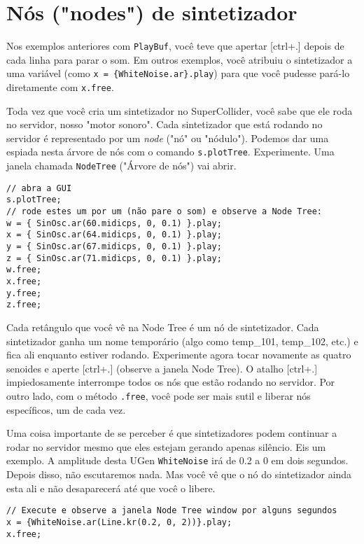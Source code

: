 \section{Nós ("nodes") de sintetizador}

Nos exemplos anteriores com \texttt{PlayBuf}, você teve que apertar [ctrl+.] depois de cada linha para parar o som. Em outros exemplos, você atribuiu o sintetizador a uma variável (como \texttt{x = \{WhiteNoise.ar\}.play}) para que você pudesse pará-lo diretamente com \texttt{x.free}.

Toda vez que você cria um sintetizador no SuperCollider, você sabe que ele roda no servidor, nosso "motor sonoro". Cada sintetizador que está rodando no servidor é representado por um \emph{node} ("nó" ou "nódulo"). Podemos dar uma espiada nesta árvore de nós com o comando \texttt{s.plotTree}. Experimente. Uma janela chamada \texttt{NodeTree} ("Árvore de nós") vai abrir.

 
\begin{lstlisting}[style=SuperCollider-IDE, basicstyle=\scttfamily\footnotesize]
// abra a GUI
s.plotTree;
// rode estes um por um (não pare o som) e observe a Node Tree:
w = { SinOsc.ar(60.midicps, 0, 0.1) }.play;
x = { SinOsc.ar(64.midicps, 0, 0.1) }.play;
y = { SinOsc.ar(67.midicps, 0, 0.1) }.play;
z = { SinOsc.ar(71.midicps, 0, 0.1) }.play;
w.free;
x.free;
y.free;
z.free;
\end{lstlisting}
 

Cada retângulo que você vê na Node Tree é um nó de sintetizador. Cada sintetizador ganha um nome temporário (algo como temp\_101, temp\_102, etc.) e fica ali enquanto estiver rodando. Experimente agora tocar novamente as quatro senoides e aperte [ctrl+.] (observe a janela Node Tree). O atalho [ctrl+.] impiedosamente interrompe todos os nós que estão rodando no servidor. Por outro lado, com o método \texttt{.free}, você pode ser mais sutil e liberar nós específicos, um de cada vez.

Uma coisa importante de se perceber é que sintetizadores podem continuar a rodar no servidor mesmo que eles estejam gerando apenas silêncio. Eis um exemplo. A amplitude desta UGen \texttt{WhiteNoise} irá de 0.2 a 0 em dois segundos. Depois disso, não escutaremos nada. Mas você vê que o nó do sintetizador ainda esta ali e não desaparecerá até que você o libere.

 
\begin{lstlisting}[style=SuperCollider-IDE, basicstyle=\scttfamily\footnotesize]
// Execute e observe a janela Node Tree window por alguns segundos
x = {WhiteNoise.ar(Line.kr(0.2, 0, 2))}.play;
x.free;
\end{lstlisting}
 

